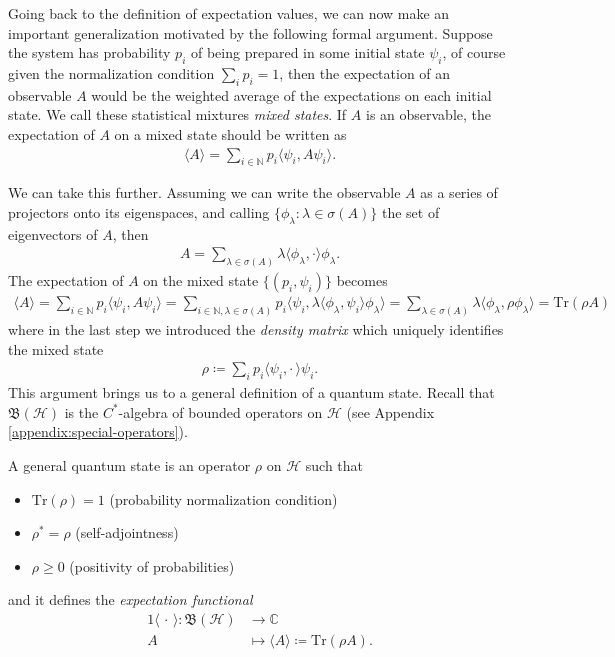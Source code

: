 Going back to the definition of expectation values, we can now make an important
generalization motivated by the following formal argument. Suppose the system has probability
$p_i$ of being prepared in some initial state $\psi_i$, of course given the normalization
condition $\sum_i p_i = 1$, then the expectation of an observable $A$ would be the weighted
average of the expectations on each initial state. We call these statistical mixtures
\textit{mixed states}. If $A$ is an observable, the expectation of $A$ on a mixed state should
be written as
\begin{align*}
	\langle A \rangle = \sum_{i\in\mathbb{N}}p_i\langle\psi_i,A\psi_i\rangle.
\end{align*}

We can take this further. Assuming we can write the observable $A$ as a series of projectors
onto its eigenspaces, and calling $\{\phi_\lambda:\lambda\in\sigma(A)\}$ the set of
eigenvectors of $A$, then
\begin{align*}
	A = \sum_{\lambda\in\sigma(A)} \lambda\langle\phi_\lambda,\cdot\rangle\phi_\lambda.
\end{align*}
The expectation of $A$ on the mixed state $\{(p_i,\psi_i)\}$ becomes
\begin{align*}
	\langle A \rangle = \sum_{i\in\mathbb{N}} p_i \langle\psi_i,A\psi_i\rangle
	= \sum_{i\in\mathbb{N},\lambda\in\sigma(A)}p_i\langle\psi_i,\lambda\langle\phi_\lambda,\psi_i\rangle\phi_\lambda\rangle
	= \sum_{\lambda\in\sigma(A)} \lambda\langle\phi_\lambda,\rho\phi_\lambda\rangle
	= \mathrm{Tr}(\rho A)
\end{align*}
where in the last step we introduced the \textit{density matrix} which uniquely identifies the
mixed state
\begin{align*}
	\rho \coloneq \sum_i p_i \langle\psi_i, \cdot\,\rangle\psi_i.
\end{align*}
This argument brings us to a general definition of a quantum state. Recall that $\mathfrak{B}(
\mathcal{H})$ is the $C^*$-algebra of bounded operators on $\mathcal{H}$ (see Appendix
\ref{appendix:special-operators}).

\begin{definition}
	A general quantum state is an operator $\rho$ on $\mathcal{H}$ such that
	\begin{itemize}
		\item $\mathrm{Tr}(\rho) = 1$ (probability normalization condition)
		\item $\rho^* = \rho$ (self-adjointness)
		\item $\rho \geq 0$ (positivity of probabilities)
	\end{itemize}
	and it defines the \textit{expectation functional}
	\begin{alignat*}{1}
		\langle\,\cdot\,\rangle : \mathfrak{B}(\mathcal{H}) &\longrightarrow \mathbb{C}\\
		A &\longmapsto \langle A \rangle \coloneq \mathrm{Tr}(\rho A).
	\end{alignat*}
\end{definition}

